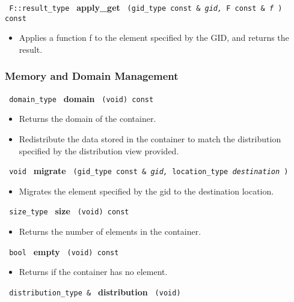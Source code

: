\noindent
\texttt{%
F::result\_type
}
\textbf{apply\_get}%
\texttt{%
(gid\_type const \&
\textit{gid,}%
F const \&
\textit{f}%
) const
}

\begin{itemize}
\item
Applies a function f to the element specified by the GID, and returns the result.
\end{itemize}
 
 
\subsubsection{Memory and Domain Management}

\noindent
\texttt{%
domain\_type 	
}
\textbf{domain}%
\texttt{%
(void) const
}

\begin{itemize}
\item
Returns the domain of the container.
\end{itemize}
 
\begin{itemize}
\item
Redistribute the data stored in the container to match the distribution specified by the distribution view provided. 
\end{itemize}
 
\noindent
\texttt{%
void
}
\textbf{migrate}%
\texttt{%
(gid\_type const \&
\textit{gid,}
location\_type 
\textit{destination}
)
}

\begin{itemize}
\item
Migrates the element specified by the gid to the destination location. 
\end{itemize}
 
\noindent
\texttt{%
size\_type
}
\textbf{size}%
\texttt{%
(void) const
}

\begin{itemize}
\item
Returns the number of elements in the container. 
\end{itemize}
 
\noindent
\texttt{%
bool
}
\textbf{empty}%
\texttt{%
(void) const
}

\begin{itemize}
\item
Returns if the container has no element.
\end{itemize}
 
\noindent
\texttt{%
distribution\_type \& 
}
\textbf{distribution}%
\texttt{%
 (void)
}
 
